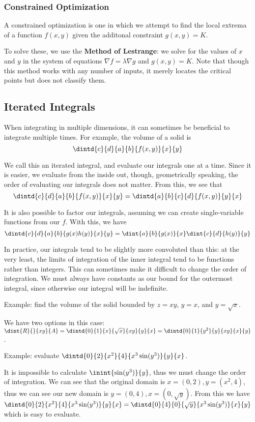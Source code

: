 \documentclass[12pt]{article}
\begin{document}
\subsubsection*{Constrained Optimization}
A constrained optimization is one in which we attempt to find the local extrema of a function $f(x,y)$ given the additonal constraint $g(x,y) = K$.

To solve these, we use the {\bf Method of Lestrange}: we solve for the values of $x$ and $y$ in the system of equations $\nabla f = \lambda \nabla g$ and $g(x,y) = K$. Note that though this method works with any number of inputs, it merely locates the critical points but does not classify them.

\subsection*{Iterated Integrals}
When integrating in multiple dimensions, it can sometimes be beneficial to integrate multiple times. For example, the volume of a solid is \[ \dintd{c}{d}{a}{b}{f(x,y)}{x}{y} \]

We call this an iterated integral, and evaluate our integrals one at a time. Since it is easier, we evaluate from the inside out, though, geometrically speaking, the order of evaluating our integrals does not matter. From this, we see that \[ \dintd{c}{d}{a}{b}{f(x,y)}{x}{y} = \dintd{a}{b}{c}{d}{f(x,y)}{y}{x} \]

It is also possible to factor our integrals, assuming we can create single-variable functions from our $f$. With this, we have \[ \dintd{c}{d}{a}{b}{g(x)h(y)}{x}{y} = \dint{a}{b}{g(x)}{x} \dint{c}{d}{h(y)}{y} \]

In practice, our integrals tend to be slightly more convoluted than this: at the very least, the limits of integration of the inner integral tend to be functions rather than integers. This can sometimes make it difficult to change the order of integration. We must always have constants as our bound for the outermost integral, since otherwise our integral will be indefinite.

Example: find the volume of the solid bounded by $z = xy$, $y = x$, and $y = \sqrt{x}$.

We have two options in this case: $\dint{R}{}{xy}{A} = \dintd{0}{1}{x}{\sqrt{x}}{xy}{y}{x} = \dintd{0}{1}{y^2}{y}{xy}{x}{y}$.

Example: evaluate $\dintd{0}{2}{x^2}{4}{x^3\sin(y^3)}{y}{x}$.

It is impossible to calculate $\inint{\sin(y^3)}{y}$, thus we must change the order of integration. We can see that the original domain is $x = (0,2), y = (x^2,4)$, thus we can see our new domain is $y = (0,4), x = (0, \sqrt{y})$. From this we have $\dintd{0}{2}{x^2}{4}{x^3\sin(y^3)}{y}{x} = \dintd{0}{4}{0}{\sqrt{y}}{x^3\sin(y^3)}{x}{y}$ which is easy to evaluate.
\end{document}
